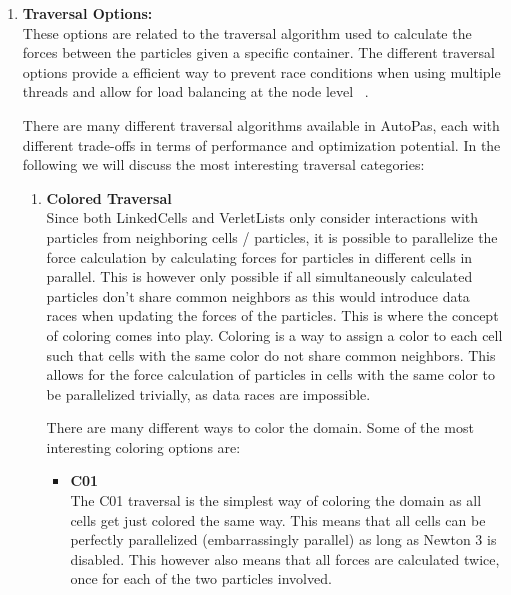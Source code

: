 \begin{enumerate}[label=\textbf{\arabic*.}]
      \item \textbf{Traversal Options:} \\
            These options are related to the traversal algorithm used to calculate the forces between the particles given a specific container. The different traversal options provide a efficient way to prevent race conditions when using multiple threads and allow for load balancing at the node level ~\cite{SECKLER2021101296}.

            There are many different traversal algorithms available in AutoPas, each with different trade-offs in terms of performance and optimization potential. In the following we will discuss the most interesting traversal categories:


            \begin{enumerate}

                  \item \textbf{Colored Traversal} \\
                        Since both LinkedCells and VerletLists only consider interactions with particles from neighboring cells / particles, it is possible to parallelize the force calculation by calculating forces for particles in different cells in parallel. This is however only possible if all simultaneously calculated particles don't share common neighbors as this would introduce data races when updating the forces of the particles. This is where the concept of coloring comes into play. Coloring is a way to assign a color to each cell such that cells with the same color do not share common neighbors. This allows for the force calculation of particles in cells with the same color to be parallelized trivially, as data races are impossible.

                        There are many different ways to color the domain. Some of the most interesting coloring options are:
                        \begin{itemize}
                              \item \textbf{C01} \\
                                    The C01 traversal is the simplest way of coloring the domain as all cells get just colored the same way. This means that all cells can be perfectly parallelized (embarrassingly parallel) as long as Newton 3 is disabled. This however also means that all forces are calculated twice, once for each of the two particles involved.


\end{itemize}
\end{enumerate}
\end{enumerate}
